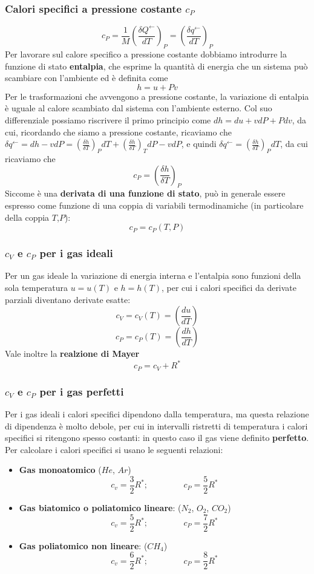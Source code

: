 \subsubsection{Calori specifici a pressione costante $c_P$}
\[
    c_P =\frac{1}{M}\left(\frac{\delta Q^\leftarrow }{dT}\right)_P = \left(\frac{\delta q^\leftarrow }{dT}\right)_P
\]
Per lavorare sul calore specifico a pressione costante dobbiamo introdurre la funzione di stato \textbf{entalpia}, che esprime la quantità di energia che un sistema può scambiare con l'ambiente ed è definita come
\[
    h = u + Pv
\]
Per le trasformazioni che avvengono a pressione costante, la variazione di entalpia è uguale al calore scambiato dal sistema con l'ambiente esterno. Col suo differenziale possiamo riscrivere il primo principio come $dh = du + vdP + Pdv$, da cui, ricordando che siamo a pressione costante, ricaviamo che $\delta q^\leftarrow = dh - vdP = \left(\frac{\delta h}{\delta T}\right)_P dT + \left(\frac{\delta h}{\delta T}\right)_T dP - vdP$, e quindi $\delta q^\leftarrow  =  \left(\frac{\delta h}{\delta T}\right)_P dT$, da cui ricaviamo che
\[
    c_P =  \left(\frac{\delta h}{\delta T}\right)_P
\]
Siccome è una \textbf{derivata di una funzione di stato}, può in generale essere espresso come funzione di una coppia di variabili termodinamiche (in particolare della coppia $T$,$P$): 
\[
    c_P = c_P(T,P)
\]
\subsubsection{$c_V$ e $c_P$ per i gas ideali}
Per un gas ideale la variazione di energia interna e l'entalpia sono funzioni della sola temperatura $u = u(T)$ e $h = h(T)$, per cui i calori specifici da derivate parziali diventano derivate esatte:
\[
    c_V = c_V(T) = \left(\frac{d u}{d T}\right)
\]
\[
    c_P = c_P(T) = \left( \frac{d h}{ d T}\right)
\]
Vale inoltre la \textbf{realzione di Mayer}
\[
    c_P = c_V + R^*
\]
\subsubsection{$c_V$ e $c_P$ per i gas perfetti}
Per i gas ideali i calori specifici dipendono dalla temperatura, ma questa relazione di dipendenza è molto debole, per cui in intervalli ristretti di temperatura i calori specifici si ritengono spesso costanti: in questo caso il gas viene definito \textbf{perfetto}.\newline
\newline
Per calcolare i calori specifici si usano le seguenti relazioni:
\begin{itemize}
    \item \textbf{Gas monoatomico} ($He$, $Ar$)
    \[
        c_v = \frac{3}{2}R^*; \;\;\;\;\;\;\;\;\;\;\;\;\;\;\;c_P = \frac{5}{2}R^*
    \]
    \item \textbf{Gas biatomico o poliatomico lineare}: ($N_2$, $O_2$, $CO_2$)
    \[
        c_v = \frac{5}{2}R^*; \;\;\;\;\;\;\;\;\;\;\;\;\;\;\;c_P = \frac{7}{2}R^*
    \]
    \item \textbf{Gas poliatomico non lineare}: ($CH_4$)
    \[
        c_v = \frac{6}{2}R^*; \;\;\;\;\;\;\;\;\;\;\;\;\;\;\;c_P = \frac{8}{2}R^*
    \]
\end{itemize}
